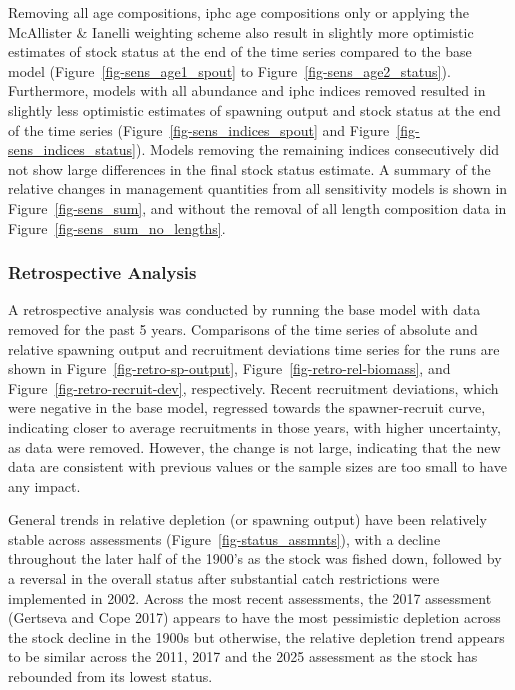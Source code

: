 \documentclass[
  english,
]{article}
\begin{document}
Removing all age compositions, \gls{iphc} age compositions only or
applying the McAllister \& Ianelli weighting scheme also result in
slightly more optimistic estimates of stock status at the end of the
time series compared to the base model (Figure~\ref{fig-sens_age1_spout}
to Figure~\ref{fig-sens_age2_status}). Furthermore, models with all
abundance and \gls{iphc} indices removed resulted in slightly less
optimistic estimates of spawning output and stock status at the end of
the time series (Figure~\ref{fig-sens_indices_spout} and
Figure~\ref{fig-sens_indices_status}). Models removing the remaining
indices consecutively did not show large differences in the final stock
status estimate. A summary of the relative changes in management
quantities from all sensitivity models is shown in
Figure~\ref{fig-sens_sum}, and without the removal of all length
composition data in Figure~\ref{fig-sens_sum_no_lengths}.

\subsubsection{Retrospective Analysis}\label{retrospective-analysis}

A retrospective analysis was conducted by running the base model with
data removed for the past 5 years. Comparisons of the time series of
absolute and relative spawning output and recruitment deviations time
series for the runs are shown in Figure~\ref{fig-retro-sp-output},
Figure~\ref{fig-retro-rel-biomass}, and
Figure~\ref{fig-retro-recruit-dev}, respectively. Recent recruitment
deviations, which were negative in the base model, regressed towards the
spawner-recruit curve, indicating closer to average recruitments in
those years, with higher uncertainty, as data were removed. However, the
change is not large, indicating that the new data are consistent with
previous values or the sample sizes are too small to have any impact.

General trends in relative depletion (or spawning output) have been
relatively stable across assessments (Figure~\ref{fig-status_assmnts}),
with a decline throughout the later half of the 1900's as the stock was
fished down, followed by a reversal in the overall status after
substantial catch restrictions were implemented in 2002. Across the most
recent assessments, the 2017 assessment (Gertseva and Cope 2017) appears
to have the most pessimistic depletion across the stock decline in the
1900s but otherwise, the relative depletion trend appears to be similar
across the 2011, 2017 and the 2025 assessment as the stock has rebounded
from its lowest status.
\end{document}

